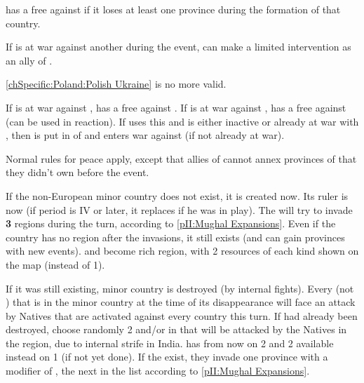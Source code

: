 \phdipl
\aparag \POL has a free \CB against \paysukraine if it loses at least one
province during the formation of that country.

\phadm
\aparag If \POL is at war against another \MAJ during the event, \HAB can make
a limited intervention as an ally of \POL.

\effetlong
\aparag \ref{chSpecific:Poland:Polish Ukraine} is no more valid.


\phevnt
\aparag If \POL is at war against \paysukraine, \SUE has a free \CB against
\POL.
\bparag If \SUE is at war against \POL, \RUS has a free \CB against \SUE (can
be used in reaction).
\bparag If \RUS uses this \CB and \paysdanemark is either inactive or already
at war with \SUE, then \paysdanemark is put in \EG of \RUS and enters war
against \SUE (if not already at war).

\phpaix
\aparag Normal rules for peace apply, except that allies of \POL cannot annex
provinces of \paysukraine that they didn't own before the event.





\phevnt
\aparag If the non-European minor country \paysMogol does not exist, it is
created now. Its ruler is now  (if period is IV or later,
it replaces \leaderAkbar if he was in play).
\aparag The \paysMogol will try to invade \textbf{3} regions during the turn,
according to \ref{pII:Mughal Expansions}.
\aparag Even if the country has no region after the invasions, it still exists
(and can gain provinces with new events).
\aparag \granderegionBengale and \granderegionKarnatika become rich region,
with 2 resources of each kind shown on the map (instead of 1).





\phevnt
\aparag If it was still existing, minor country \paysVijayanagar is destroyed
(by internal fights).  Every \TP (not \COL) that is in the minor country
\paysVijayanagar at the time of its disappearance will face an attack by
Natives that are activated against every country this turn.
\aparag If \paysVijayanagar had already been destroyed, choose randomly 2 \TP
and/or \COL in  that will be attacked by the Natives in the
region, due to internal strife in India.
\aparag \granderegionKarnatika has from now on 2  and 2
 available instead on 1 (if not yet done).
\aparag If the \paysMogol exist, they invade one province with a modifier of
, the next in the list according to \ref{pII:Mughal Expansions}.



